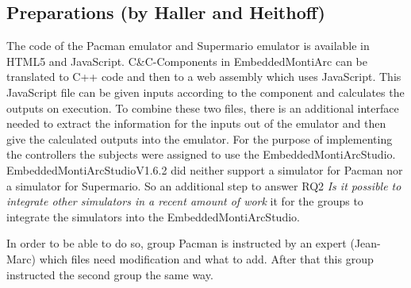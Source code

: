 \subsection{Preparations (by Haller and Heithoff)}
The code of the Pacman emulator \cite{PacmanLink} and Supermario emulator \cite{marioLink} is available in HTML5 and JavaScript. C\&C-Components in EmbeddedMontiArc can be translated to C++ code and then to a web assembly \cite{KRSvW18} which uses JavaScript. This JavaScript file can be given inputs according to the component and calculates the outputs on execution. To combine these two files, there is an additional interface needed to extract the information for the inputs out of the emulator and then give the calculated outputs into the emulator.
For the purpose of implementing the controllers the subjects were assigned to use the EmbeddedMontiArcStudio.
EmbeddedMontiArcStudioV1.6.2 did neither support a simulator for Pacman nor a simulator for Supermario. So an additional step to answer RQ2 \textit{Is it possible to integrate other simulators in a recent amount of work} it for the groups to integrate the simulators into the EmbeddedMontiArcStudio.

In order to be able to do so, group Pacman is instructed by an expert (Jean-Marc) which files need modification and what to add. After that this group instructed the second group the same way.

